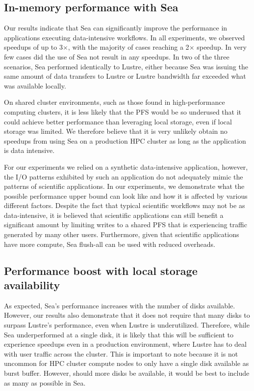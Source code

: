 \documentclass[10pt,journal,compsoc]{IEEEtran}
\begin{document}
    \subsection{In-memory performance with Sea}
   
    Our results indicate that Sea can significantly improve the performance in
    applications executing data-intensive workflows. In all experiments, we
    observed speedups of up to 3$\times$, with the majority of cases reaching a
    2$\times$ speedup. In very few cases did the use of Sea not result in any
    speedups. In two of the three scenarios, Sea performed identically to
    Lustre, either because Sea was issuing the same amount of data transfers to
    Lustre or Lustre bandwidth far exceeded what was available locally.

    On shared cluster environments, such as those found in high-performance
    computing clusters, it is less likely that the PFS would be so underused
    that it could achieve better performance than leveraging local storage, even
    if local storage was limited. We therefore believe that it is very unlikely
    obtain no speedups from using Sea on a production HPC cluster as long as the
    application is data intensive.
    
    For our experiments we relied on a synthetic data-intensive application,
    however, the I/O patterns exhibited by such an application do not adequately
    mimic the patterns of scientific applications. In our experiments, we
    demonstrate what the possible performance upper bound can look like and how
    it is affected by various different factors. Despite the fact that typical
    scientific workflows may not be as data-intensive, it is believed that
    scientific applications can still benefit a significant amount by limiting
    writes to a shared PFS that is experiencing traffic generated by many other
    users. Furthermore, given that scientific applications have more compute,
    Sea flush-all can be used with reduced overheads.

    \subsection{Performance boost with local storage availability}

    As expected, Sea's performance increases with the number of disks available.
    However, our results also demonstrate that it does not require that many
    disks to surpass Lustre's performance, even when Lustre is underutilized.
    Therefore, while Sea underperformed at a single disk, it is likely that this
    will be sufficient to experience speedups even in a production environment,
    where Lustre has to deal with user traffic across the cluster. This is
    important to note because it is not uncommon for HPC cluster compute nodes
    to only have a single disk available as burst buffer. However, should more
    disks be available, it would be best to include as many as possible in Sea.
\end{document}
